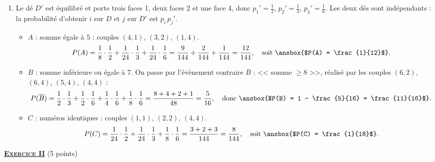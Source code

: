 \begin{enumerate}
   \item {}
      Le d\'e $D'$ est \'equilibr\'e et porte trois faces 1, deux faces 2 et une face 4, donc
      $p_1' = \frac{1}{2}$, $p_2' = \frac{1}{3}$, $p_4' = \frac{1}{6}$.
      Les deux d\'es sont ind\'ependants : la probabilit\'e d'obtenir $i$ sur $D$ et $j$ sur $D'$ est $p_i\, p_j'$.
      \begin{itemize}
         \item $A$ : somme \'egale \`a $5$ : couples $(4,1)$, $(3,2)$, $(1,4)$.
            \[
               P(A) = \frac{1}{8}\cdot\frac{1}{2} + \frac{1}{24}\cdot\frac{1}{3} + \frac{1}{24}\cdot\frac{1}{6}
                    = \frac{9}{144} + \frac{2}{144} + \frac{1}{144} = \frac{12}{144},
               \quad \text{soit } \ansbox{$P(A) = \frac{1}{12}$}.
            \]
         \item $B$ : somme inf\'erieure ou \'egale \`a $7$. On passe par l'\'ev\`enement contraire
            $\overline{B}$ : << somme $\geq 8$ >>, r\'ealis\'e par les couples $(6,2)$, $(6,4)$, $(5,4)$, $(4,4)$ :
            \[
               P(\overline{B}) = \frac{1}{2}\cdot\frac{1}{3} + \frac{1}{2}\cdot\frac{1}{6} + \frac{1}{4}\cdot\frac{1}{6}
                  + \frac{1}{8}\cdot\frac{1}{6} = \frac{8 + 4 + 2 + 1}{48} = \frac{5}{16},
               \quad \text{donc } \ansbox{$P(B) = 1 - \frac{5}{16} = \frac{11}{16}$}.
            \]
         \item $C$ : num\'eros identiques : couples $(1,1)$, $(2,2)$, $(4,4)$.
            \[
               P(C) = \frac{1}{24}\cdot\frac{1}{2} + \frac{1}{24}\cdot\frac{1}{3} + \frac{1}{8}\cdot\frac{1}{6}
                    = \frac{3 + 2 + 3}{144} = \frac{8}{144},
               \quad \text{soit } \ansbox{$P(C) = \frac{1}{18}$}.
            \]
      \end{itemize}
\end{enumerate}
\noindent \underline{\textsc{\textbf{Exercice II}}} (5 points)
